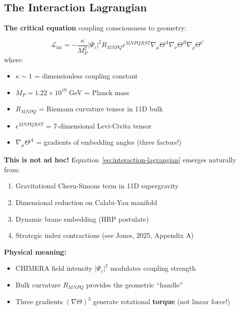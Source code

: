 \subsection{The Interaction Lagrangian}
\label{subsec:interaction-lagrangian}

\textbf{The critical equation} coupling consciousness to geometry:

\begin{equation}
\label{eq:interaction-lagrangian}
\mathcal{L}_{\text{int}} = -\frac{\kappa}{M_P^2}|\Psi_c|^2 R_{MNPQ} \epsilon^{MNPQRST} \nabla_\mu\Theta^A \nabla_\nu\Theta^B \nabla_\rho\Theta^C
\end{equation}
where:
\begin{itemize}
\item $\kappa \sim 1$ = dimensionless coupling constant
\item $M_P = 1.22 \times 10^{19}$ GeV = Planck mass
\item $R_{MNPQ}$ = Riemann curvature tensor in 11D bulk
\item $\epsilon^{MNPQRST}$ = 7-dimensional Levi-Civita tensor
\item $\nabla_\mu\Theta^A$ = gradients of embedding angles (three factors!)
\end{itemize}

\begin{importantbox}
\textbf{This is not ad hoc!} Equation~\eqref{eq:interaction-lagrangian} emerges naturally from:
\begin{enumerate}
\item Gravitational Chern-Simons term in 11D supergravity
\item Dimensional reduction on Calabi-Yau manifold
\item Dynamic brane embedding (HRP postulate)
\item Strategic index contractions (see Jones, 2025, Appendix A)
\end{enumerate}
\end{importantbox}

\textbf{Physical meaning:}
\begin{itemize}
\item CHIMERA field intensity $|\Psi_c|^2$ modulates coupling strength
\item Bulk curvature $R_{MNPQ}$ provides the geometric ``handle''
\item Three gradients $(\nabla\Theta)^3$ generate rotational \textbf{torque} (not linear force!)
\end{itemize}

